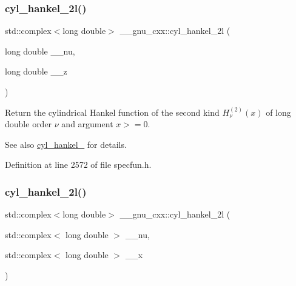 \subsubsection{\texorpdfstring{cyl\+\_\+hankel\+\_\+2l()}{cyl\_hankel\_2l()}\hspace{0.1cm}{\footnotesize\ttfamily [1/2]}}
{\footnotesize\ttfamily std\+::complex$<$long double$>$ \+\_\+\+\_\+gnu\+\_\+cxx\+::cyl\+\_\+hankel\+\_\+2l (\begin{DoxyParamCaption}\item[{long double}]{\+\_\+\+\_\+nu,  }\item[{long double}]{\+\_\+\+\_\+z }\end{DoxyParamCaption})\hspace{0.3cm}{\ttfamily [inline]}}

Return the cylindrical Hankel function of the second kind $ H^{(2)}_\nu(x) $ of {\ttfamily long double} order $ \nu $ and argument $ x >= 0 $.

\begin{DoxySeeAlso}{See also}
\hyperlink{group__gnu__math__spec__func_ga7ebc71dd48ac97255d72f5f5f43dfd8e}{cyl\+\_\+hankel\+\_} for details. 
\end{DoxySeeAlso}


Definition at line 2572 of file specfun.\+h.

\mbox{\label{group__gnu__math__spec__func_ga1ac6434925254bd02e108f5a4e52b34d}} 
\subsubsection{\texorpdfstring{cyl\+\_\+hankel\+\_\+2l()}{cyl\_hankel\_2l()}\hspace{0.1cm}{\footnotesize\ttfamily [2/2]}}
{\footnotesize\ttfamily std\+::complex$<$long double$>$ \+\_\+\+\_\+gnu\+\_\+cxx\+::cyl\+\_\+hankel\+\_\+2l (\begin{DoxyParamCaption}\item[{std\+::complex$<$ long double $>$}]{\+\_\+\+\_\+nu,  }\item[{std\+::complex$<$ long double $>$}]{\+\_\+\+\_\+x }\end{DoxyParamCaption})\hspace{0.3cm}{\ttfamily [inline]}}

